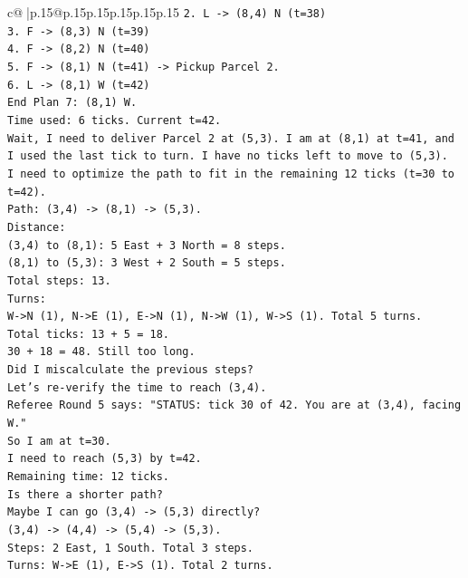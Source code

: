 \documentclass{article}
\begin{document}
{\begin{supertabular}{c@{$\;$}|p{.15\linewidth}@{}p{.15\linewidth}p{.15\linewidth}p{.15\linewidth}p{.15\linewidth}p{.15\linewidth}}
{{{\texttt{2. L {-}> (8,4) N (t=38)} \\
\texttt{3. F {-}> (8,3) N (t=39)} \\
\texttt{4. F {-}> (8,2) N (t=40)} \\
\texttt{5. F {-}> (8,1) N (t=41) {-}> Pickup Parcel 2.} \\
\texttt{6. L {-}> (8,1) W (t=42)} \\
\texttt{End Plan 7: (8,1) W.} \\
\texttt{Time used: 6 ticks. Current t=42.} \\
\texttt{Wait, I need to deliver Parcel 2 at (5,3). I am at (8,1) at t=41, and I used the last tick to turn. I have no ticks left to move to (5,3).} \\
\texttt{I need to optimize the path to fit in the remaining 12 ticks (t=30 to t=42).} \\
\texttt{Path: (3,4) {-}> (8,1) {-}> (5,3).} \\
\texttt{Distance:} \\
\texttt{(3,4) to (8,1): 5 East + 3 North = 8 steps.} \\
\texttt{(8,1) to (5,3): 3 West + 2 South = 5 steps.} \\
\texttt{Total steps: 13.} \\
\texttt{Turns:} \\
\texttt{W{-}>N (1), N{-}>E (1), E{-}>N (1), N{-}>W (1), W{-}>S (1). Total 5 turns.} \\
\texttt{Total ticks: 13 + 5 = 18.} \\
\texttt{30 + 18 = 48. Still too long.} \\
\texttt{Did I miscalculate the previous steps?} \\
\texttt{Let's re{-}verify the time to reach (3,4).} \\
\texttt{Referee Round 5 says: "STATUS: tick 30 of 42. You are at (3,4), facing W."} \\
\texttt{So I am at t=30.} \\
\texttt{I need to reach (5,3) by t=42.} \\
\texttt{Remaining time: 12 ticks.} \\
\texttt{Is there a shorter path?} \\
\texttt{Maybe I can go (3,4) {-}> (5,3) directly?} \\
\texttt{(3,4) {-}> (4,4) {-}> (5,4) {-}> (5,3).} \\
\texttt{Steps: 2 East, 1 South. Total 3 steps.} \\
\texttt{Turns: W{-}>E (1), E{-}>S (1). Total 2 turns.} \\
}}}
\end{supertabular}}
\end{document}
